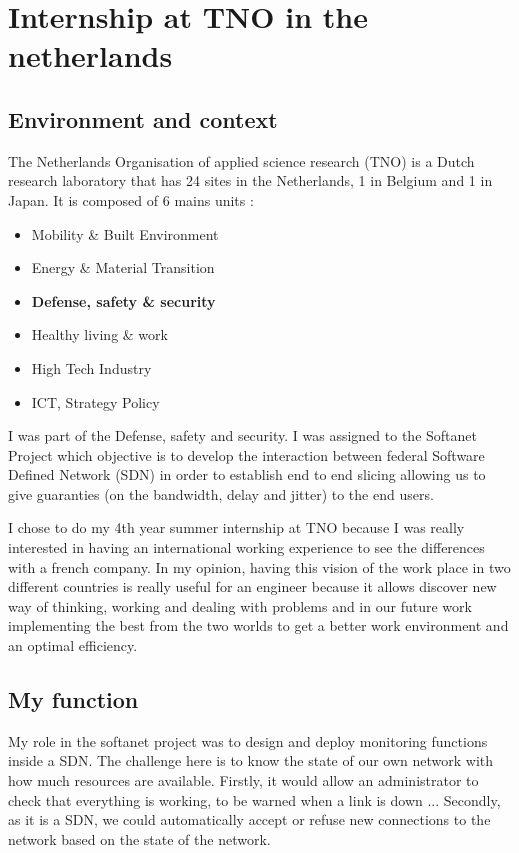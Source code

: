 \section{Internship at TNO in the netherlands}

\subsection{Environment and context}
The Netherlands Organisation of applied science research (TNO) is a Dutch research laboratory
that has 24 sites in the Netherlands, 1 in Belgium and 1 in Japan. It is composed of 6 mains units :
\smallskip

\begin{itemize}
    \item Mobility \& Built Environment
    \item Energy \& Material Transition
    \item \textbf{Defense, safety \& security}
    \item Healthy living  \& work
    \item High Tech Industry
    \item ICT, Strategy Policy
\end{itemize}
\smallskip

I was part of the Defense, safety and security. I was assigned to the Softanet Project which
objective is to develop the interaction between federal Software Defined Network (SDN) in order to
establish end to end slicing allowing us to give guaranties (on the bandwidth, delay and jitter) to
the end users.
\smallskip

I chose to do my 4th year summer internship at TNO because I was really interested in having
an international working experience to see the differences with a french company. In my opinion,
having this vision of the work place in two different countries is really useful for an engineer because
it allows discover new way of thinking, working and dealing with problems and in our future work
implementing the best from the two worlds to get a better work environment and an optimal
efficiency.

\subsection{My function}


My role in the softanet project was to design and deploy monitoring functions inside a SDN.
The challenge here is to know the state of our own network with how much resources are available.
Firstly, it would allow an administrator to check that everything is working, to be warned when a
link is down ... Secondly, as it is a SDN, we could automatically accept or refuse new connections
to the network based on the state of the network.


